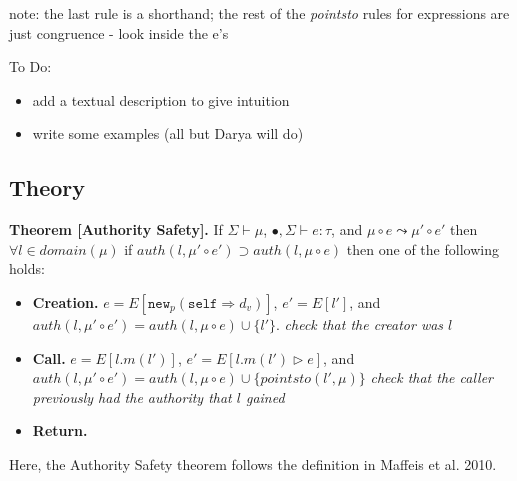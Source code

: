 \documentclass{llncs}
\newcommand{\keywadj}[1]{\mathtt{#1}}
\newcommand{\stepsto}{\leadsto}
\begin{document}
note: the last rule is a shorthand; the rest of the \textit{pointsto} rules for expressions are just congruence - look inside the e's

To Do:

\begin{itemize}
\item add a textual description to give intuition
\item write some examples (all but Darya will do)
\end{itemize}

\newpage

\subsection{Theory}

\textbf{Theorem [Authority Safety].}  If $\Sigma \vdash \mu$, $\bullet, \Sigma \vdash e : \tau$, and $\mu \circ e \stepsto \mu' \circ e'$ then $\forall l \in domain(\mu)$ if $auth(l,\mu' \circ e') \supset auth(l,\mu \circ e)$ then one of the following holds:

\begin{itemize}
  \item \textbf{Creation.} $e = E[\keywadj{new}_p(\keywadj{self} \Rightarrow d_v)]$, $e' = E[l']$, and $auth(l,\mu' \circ e') = auth(l,\mu \circ e) \cup \{ l' \}$.  \textit{check that the creator was $l$}
  \item \textbf{Call.} $e = E[l.m(l')]$, $e' = E[l.m(l') \rhd e]$, and $auth(l,\mu' \circ e') = auth(l,\mu \circ e) \cup \{ pointsto(l',\mu) \}$  \textit{check that the caller previously had the authority that $l$ gained}
  \item \textbf{Return.}
\end{itemize}

Here, the Authority Safety theorem follows the definition in Maffeis et al. 2010.
\end{document}
